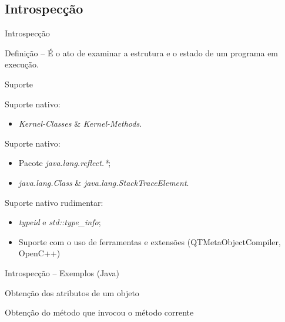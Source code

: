 \documentclass[12pt,t]{beamer}
\begin{document}
 	 \subsection{Introspecção}
 	 \begin{frame}{Introspecção}
 	 	\begin{block}{Definição -- \cite{forman2004java}}
 	 		É o ato de examinar a estrutura e o estado de um programa em execução.
 	 	\end{block}
 	 	\pause
 	 	\begin{block}{Suporte}
 	 		\begin{description}[Smalltalk:]
 	 			\item [Smalltalk:] Suporte nativo:
	 	 			\begin{itemize}
	 	 				\item \emph{Kernel-Classes} \& \emph{Kernel-Methods}.
	 	 			\end{itemize}
	 	 		\pause
 	 			\item [Java:] Suporte nativo: 
 	 			\begin{itemize}
	 	 			\item Pacote \emph{java.lang.reflect.*}; \\ 
	 	 			\item \emph{java.lang.Class} \& \emph{java.lang.StackTraceElement}.
 	 			\end{itemize}
 	 			\pause
 	 			\item [C++:] Suporte nativo rudimentar: 
	 	 			\begin{itemize}
	 	 				\item \emph{typeid} e \emph{std::type\_info};
	 	 				\item Suporte com o uso de ferramentas e extensões (QTMetaObjectCompiler, OpenC++)
	 	 			\end{itemize}
 			\end{description}
 		\end{block}
 	 \end{frame}
 	 \begin{frame}{Introspecção -- Exemplos (Java)}
 	 	\begin{exampleblock}{Obtenção dos atributos de um objeto}
 	 		
 	 	\end{exampleblock}
 	 	\pause
 	 	\begin{exampleblock}{Obtenção do método que invocou o método corrente}
 	 		
 	 	\end{exampleblock}
 	 \end{frame}
\end{document}
